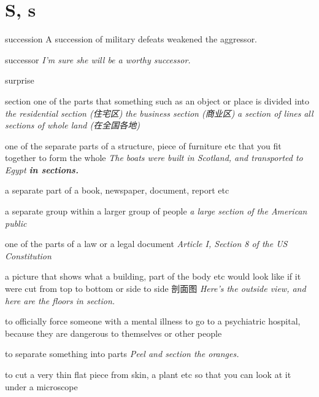\section{S, s}

\begin{DefWord}{succession}
    A succession of military defeats weakened the aggressor.
\end{DefWord}

\begin{DefWord}{successor}
    \textit{I'm sure she will be a worthy successor.}
\end{DefWord}

\begin{DefWord}{surprise}
\end{DefWord}

\begin{DefWord}{section}
    one of the parts that something such as an object or place is divided into
    \textit{the residential section (住宅区)}
    \textit{the business section (商业区)}
    \textit{a section of lines}
    \textit{all sections of whole land (在全国各地)}

    one of the separate parts of a structure, piece of furniture etc that you fit together to form the whole
    \textit{The boats were built in Scotland, and transported to Egypt \textbf{in sections.}}

    a separate part of a book, newspaper, document, report etc

    a separate group within a larger group of people
    \textit{a large section of the American public}

    one of the parts of a law or a legal document
    \textit{Article I, Section 8 of the US Constitution}

    a picture that shows what a building, part of the body etc would look like if it were cut from top to bottom or side to side 剖面图
    \textit{Here's the outside view, and here are the floors in section.}

    to officially force someone with a mental illness to go to a psychiatric hospital, because they are dangerous to themselves or other people

    to separate something into parts
    \textit{Peel and section the oranges.}

    to cut a very thin flat piece from skin, a plant etc so that you can look at it under a microscope
\end{DefWord}

